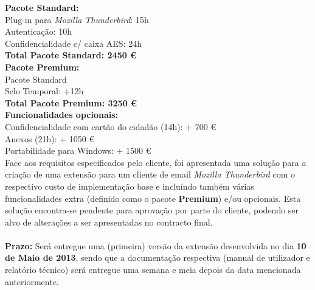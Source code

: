 \documentclass[times, 10pt,twocolumn]{article}
\begin{document}
\textbf{Pacote Standard:} \\
\indent \indent Plug-in para \emph{Mozilla Thunderbird}: 15h\\
\indent \indent Autentica\c{c}\~ao: 10h \\
\indent \indent Confidencialidade c/ caixa AES: 24h \\

\textbf{Total Pacote Standard: 2450 \euro} \\

\textbf{Pacote Premium:} \\
 \indent \indent Pacote Standard\\
 \indent \indent Selo Temporal: +12h\\

\textbf{Total Pacote Premium: 3250 \euro} \\

\indent \textbf{Funcionalidades opcionais:}\\
\indent \indent Confidencialidade com cart\~ao do cidad\~ao (14h): + 700 \euro \\
\indent \indent Anexos (21h): + 1050 \euro \\
\indent \indent Portabilidade para Windows: + 1500 \euro \\

Face aos requisitos especificados pelo cliente, foi apresentada uma solu\c{c}\~ao para a cria\c{c}\~ao de uma extens\~ao para um cliente de email \emph{Mozilla Thunderbird} com o respectivo custo de implementa\c{c}\~ao base e inclu\'indo tamb\'em v\'arias funcionalidades extra (definido como o pacote \textbf{Premium}) e/ou opcionais. Esta solu\c{c}\~ao encontra-se pendente para aprova\c{c}\~ao por parte do cliente, podendo ser alvo de altera\c{c}\~oes a ser apresentadas no contracto final.\\
\\
\indent \textbf{Prazo:} Ser\'a entregue uma (primeira) vers\~ao da extens\~ao desenvolvida no dia \textbf{10 de Maio de 2013}, sendo que a documenta\c{c}\~ao respectiva (manual de utilizador e relatório t\'ecnico) ser\'a entregue uma semana e meia depois da data mencionada anteriormente.
\end{document}
